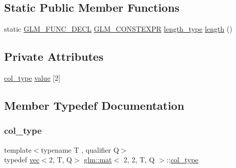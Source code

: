 \subsection*{Static Public Member Functions}
\begin{DoxyCompactItemize}
\item 
static \mbox{\hyperlink{setup_8hpp_ab2d052de21a70539923e9bcbf6e83a51}{G\+L\+M\+\_\+\+F\+U\+N\+C\+\_\+\+D\+E\+CL}} \mbox{\hyperlink{setup_8hpp_a08b807947b47031d3a511f03f89645ad}{G\+L\+M\+\_\+\+C\+O\+N\+S\+T\+E\+X\+PR}} \mbox{\hyperlink{structglm_1_1mat_3_012_00_012_00_01_t_00_01_q_01_4_a96c65b091fc8fe8e6f5637e30c9c1f81}{length\+\_\+type}} \mbox{\hyperlink{structglm_1_1mat_3_012_00_012_00_01_t_00_01_q_01_4_a7b681dcae80386d30308def77cd2646e}{length}} ()
\end{DoxyCompactItemize}
\subsection*{Private Attributes}
\begin{DoxyCompactItemize}
\item 
\mbox{\hyperlink{structglm_1_1mat_3_012_00_012_00_01_t_00_01_q_01_4_a2983591534ee443dd378cedcbe771749}{col\+\_\+type}} \mbox{\hyperlink{structglm_1_1mat_3_012_00_012_00_01_t_00_01_q_01_4_a68d5d8eb032c2089e37ffe09c786da80}{value}} \mbox{[}2\mbox{]}
\end{DoxyCompactItemize}


\subsection{Member Typedef Documentation}
\mbox{\label{structglm_1_1mat_3_012_00_012_00_01_t_00_01_q_01_4_a2983591534ee443dd378cedcbe771749}} 
\subsubsection{\texorpdfstring{col\+\_\+type}{col\_type}}
{\footnotesize\ttfamily template$<$typename T , qualifier Q$>$ \\
typedef \mbox{\hyperlink{structglm_1_1vec}{vec}}$<$2, T, Q$>$ \mbox{\hyperlink{structglm_1_1mat}{glm\+::mat}}$<$ 2, 2, T, Q $>$\+::\mbox{\hyperlink{structglm_1_1mat_3_012_00_012_00_01_t_00_01_q_01_4_a2983591534ee443dd378cedcbe771749}{col\+\_\+type}}}

